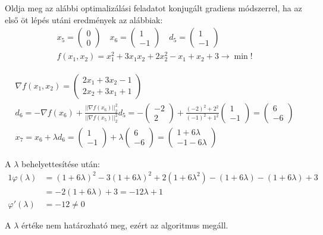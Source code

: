 \feladatszam Oldja meg az alábbi optimalizálási feladatot konjugált gradiens módszerrel, ha az első öt lépés utáni eredmények az alábbiak: 
\begin{gather*}
x_5 = \left(\begin{array}{c}0\\0\end{array}\right) \quad 
x_6 = \left(\begin{array}{c}1\\-1\end{array}\right) \quad
d_5 = \left(\begin{array}{c}1\\-1\end{array}\right)\\
f(x_1,x_2)=x_1^2+3x_1x_2+2x_2^2-x_1+x_2+3\rightarrow\min!
\end{gather*}


\begin{megoldas}
\begin{gather*}
\nabla f(x_1,x_2)=\left(\begin{array}{c}2x_1+3x_2-1\\2x_2+3x_1+1\end{array}\right)\\
d_6=-\nabla f(x_6)+\frac{||\nabla f(x_{6})||_2^2}{||\nabla f(x_5)||_2^2}d_5=-\left(\begin{array}{c}-2\\2\end{array}\right)+\frac{(-2)^2+2^2}{(-1)^2+1^2}\left(\begin{array}{c}1\\-1\end{array}\right)=\left(\begin{array}{c}6\\-6\end{array}\right)\\
x_7=x_6+\lambda d_6=\left(\begin{array}{c}1\\-1\end{array}\right)+\lambda\left(\begin{array}{c}6\\-6\end{array}\right)=\left(\begin{array}{c}1+6\lambda\\-1-6\lambda\end{array}\right)
\end{gather*}

A $\lambda$ behelyettesítése után:
\begin{alignat*}{1}
\varphi(\lambda)&=(1+6\lambda)^2-3(1+6\lambda)^2+2(1+6\lambda^2)-(1+6\lambda)-(1+6\lambda)+3\\
&=-2(1+6\lambda)+3=-12\lambda+1\\
\varphi'(\lambda)&=-12\neq0
\end{alignat*}

A $\lambda$ értéke nem határozható meg, ezért az algoritmus megáll.
\end{megoldas}
